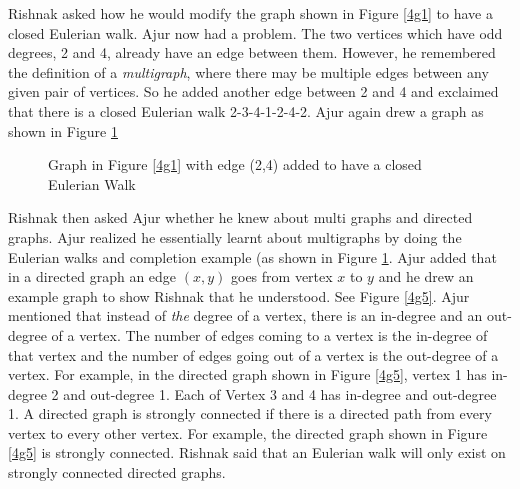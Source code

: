 Rishnak asked how he would modify the graph shown in Figure \ref{4g1} to have a closed Eulerian walk. Ajur now had a problem. The two vertices which have odd degrees, 2 and 4, already have an edge between them. However, he remembered the definition of a \emph{multigraph}, where there may be multiple edges between any given pair of vertices. So he added another edge between 2 and 4 and exclaimed that there is a closed Eulerian walk 2-3-4-1-2-4-2. Ajur again drew a graph as shown in Figure \ref{4g155}
\begin{figure}
\begin{center}
\caption{ Graph in Figure \ref{4g1} with edge (2,4) added to have a closed Eulerian Walk}\label{4g155}
\end{center}
\end{figure}

\vspace{3in}
Rishnak then asked Ajur whether he knew about multi graphs and directed graphs. Ajur realized he essentially learnt about multigraphs  by doing the Eulerian walks and completion  example (as shown in Figure \ref{4g155}. Ajur added that in a directed graph an edge $(x,y)$ goes from vertex $x$ to $y$ and he drew an example graph to show Rishnak that he understood. See Figure \ref{4g5}. 
Ajur mentioned that instead of \emph{the} degree of a vertex, there is an in-degree and an out-degree of a vertex. The number of edges coming to a vertex is the in-degree of that vertex and the number of edges going out of a vertex is the out-degree of a vertex. For example, in the directed graph shown in Figure \ref{4g5}, vertex 1 has in-degree 2 and out-degree 1. Each of Vertex 3 and 4 has in-degree  and out-degree 1. A directed graph is strongly connected if there is a directed path from every vertex to every other vertex. For example, the directed graph shown in Figure \ref{4g5} is strongly connected. Rishnak said that an Eulerian walk will only exist on strongly connected directed graphs.

